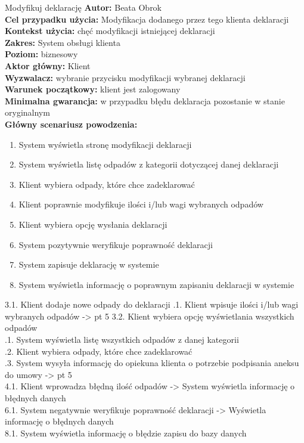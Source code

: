 	\begin{usecase}{Modyfikuj deklarację}
		\textbf{Autor:} Beata Obrok \\
		\textbf{Cel przypadku użycia:} Modyfikacja dodanego przez tego klienta deklaracji \\
		\textbf{Kontekst użycia:} chęć modyfikacji istniejącej deklaracji\\
		\textbf{Zakres:} System obsługi klienta \\
		\textbf{Poziom:} biznesowy \\
		\textbf{Aktor główny:} Klient\\
		\textbf{Wyzwalacz:} wybranie przycisku modyfikacji wybranej deklaracji \\
		\textbf{Warunek początkowy:} klient jest zalogowany\\
		\textbf{Minimalna gwarancja:} w przypadku błędu deklaracja pozostanie w stanie oryginalnym \\
		\textbf{Główny scenariusz powodzenia:} \\
			\begin{enumerate}
				\item System wyświetla stronę modyfikacji deklaracji
				\item System wyświetla listę odpadów z kategorii dotyczącej danej deklaracji
				\item Klient wybiera odpady, które chce zadeklarować
				\item Klient poprawnie modyfikuje ilości i/lub wagi wybranych odpadów
				\item Klient wybiera opcję wysłania deklaracji
				\item System pozytywnie weryfikuje poprawność deklaracji
				\item System zapisuje deklarację w systemie
				\item System wyświetla informację o poprawnym zapisaniu deklaracji w systemie
			\end{enumerate}
				3.1. Klient dodaje nowe odpady do deklaracji
					.1. Klient wpisuje ilości i/lub wagi wybranych odpadów -> pt 5
				3.2. Klient wybiera opcję wyświetlania wszystkich odpadów \\
					.1. System wyświetla listę wszystkich odpadów z danej kategorii \\
					.2. Klient wybiera odpady, które chce zadeklarować \\
					.3. System wysyła informację do opiekuna klienta o potrzebie podpisania aneksu do umowy -> pt 5 \\
				4.1. Klient wprowadza błędną ilość odpadów -> System wyświetla informację o błędnych danych \\
				6.1. System negatywnie weryfikuje poprawność deklaracji -> Wyświetla informację o błędnych danych \\
				8.1. System wyświetla informację o błędzie zapisu do bazy danych \\
	\end{usecase}

